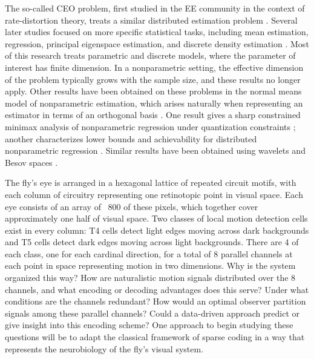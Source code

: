The so-called CEO problem, first studied in the EE 
community in the context of rate-distortion theory, treats a
similar distributed estimation problem \citep{berger1996ceo,
  viswanathan1997quadratic}. Several later studies
focused on more specific statistical tasks, including mean
estimation, regression, principal eigenspace estimation, and discrete
density estimation \citep{zhang2013information, shamir2014fundamental,
  battey2015distributed, braverman2016communication,
  diakonikolas2017communication, fan2017distributed,
  lee2017communication, shang2017computational}. Most of this 
research treats parametric and discrete models, where the
parameter of interest has finite dimension.  In a nonparametric
setting, the effective dimension of the problem typically grows with
the sample size, and these results no longer apply.
Other results have been obtained on these problems in the normal means
model of nonparametric estimation, which arises naturally when representing an estimator in terms of an
orthogonal
basis \citep{johnstone2002function,tsybakov:2008}.  One
result gives a sharp constrained minimax analysis of nonparametric
regression under quantization constraints \citep{Zhu:18}; another
characterizes lower bounds and achievability for distributed
nonparametric regression \citep{Zhu:18b}. Similar results have been obtained 
using wavelets and Besov spaces \citep{szabo18}.


The fly's eye is arranged in a hexagonal lattice of repeated circuit
motifs, with each column of circuitry representing one retinotopic
point in visual space. Each eye consists of an array of ~800 of
these pixels, which together cover approximately one half of visual
space. Two classes of local motion detection cells exist in every
column: T4 cells detect light edges moving across
dark backgrounds and T5 cells detect dark edges moving across
light backgrounds. There are 4 of each class, one for each cardinal
direction, for a total of 8 parallel channels at each point in space
representing motion in two dimensions. Why is the system organized
this way? How are naturalistic motion signals distributed over the 8
channels, and what encoding or decoding advantages does this serve?
Under what conditions are the channels redundant? How would an optimal
observer partition signals among these parallel channels? Could a data-driven 
approach predict or give insight into this encoding scheme?
One approach to begin studying these questions will be to adapt
the classical framework of sparse coding \citep{Olshausen:Field:96}
in a way that represents the neurobiology of the fly's visual system.


